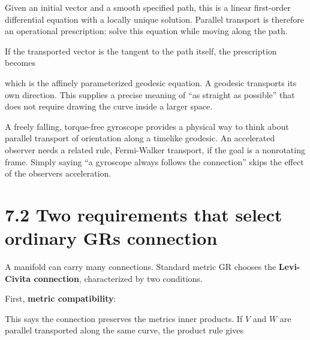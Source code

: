 \documentclass[
  11pt,
  letterpaper,
  oneside,
  openany]{scrbook}
\begin{document}
Given an initial vector and a smooth specified path, this is a linear
first-order differential equation with a locally unique solution.
Parallel transport is therefore an operational prescription: solve this
equation while moving along the path.

If the transported vector is the tangent to the path itself, the
prescription becomes

\begin{center}
\begingroup
{}
\ifdim\wd\grmathbox>\linewidth
\resizebox{\linewidth}{!}{\usebox{\grmathbox}}
\else\usebox{\grmathbox}\fi
\endgroup
\end{center}

which is the affinely parameterized geodesic equation. A geodesic
transports its own direction. This supplies a precise meaning of ``as
straight as possible'' that does not require drawing the curve inside a
larger space.

A freely falling, torque-free gyroscope provides a physical way to think
about parallel transport of orientation along a timelike geodesic. An
accelerated observer needs a related rule, Fermi-Walker transport, if
the goal is a nonrotating frame. Simply saying ``a gyroscope always
follows the connection'' skips the effect of the
observer\textquotesingle s acceleration.

\hypertarget{two-requirements-that-select-ordinary-grs-connection}{%
\section{7.2 Two requirements that select ordinary GR\textquotesingle s
connection}\label{two-requirements-that-select-ordinary-grs-connection}}

A manifold can carry many connections. Standard metric GR chooses the
\textbf{Levi-Civita connection}, characterized by two conditions.

First, \textbf{metric compatibility}:

\begin{center}
\begingroup
{}
\ifdim\wd\grmathbox>\linewidth
\resizebox{\linewidth}{!}{\usebox{\grmathbox}}
\else\usebox{\grmathbox}\fi
\endgroup
\end{center}

This says the connection preserves the metric\textquotesingle s inner
products. If \(V\) and \(W\) are parallel transported along the same
curve, the product rule gives
\end{document}
